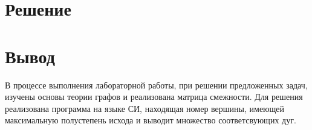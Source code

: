 \documentclass[a4paper,14pt]{extarticle}
\begin{document}
  \section*{Решение}

  \section*{Вывод}
  В процессе выполнения лабораторной работы, при решении предложенных задач, изучены основы теории графов и реализована матрица смежности. Для решения реализована программа на языке СИ, находящая номер вершины, имеющей максимальную полустепень исхода и выводит множество соответсвующих дуг.
\end{document}
